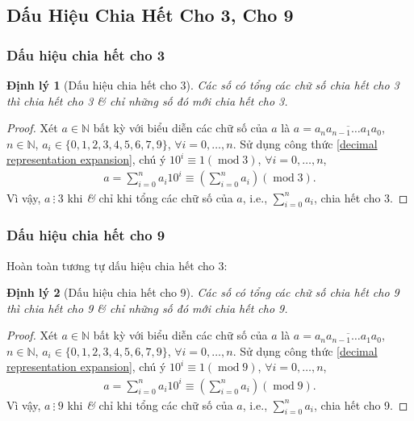 \documentclass{article}
\numberwithin{equation}{section}
\newtheorem{dinhly}{Định lý}[section]
\begin{document}

\subsection{Dấu Hiệu Chia Hết Cho 3, Cho 9}

\subsubsection{Dấu hiệu chia hết cho 3}

\begin{dinhly}[Dấu hiệu chia hết cho 3]
	Các số có tổng các chữ số chia hết cho 3 thì chia hết cho 3 \textit{\&} chỉ những số đó mới chia hết cho 3.
\end{dinhly}

\begin{proof}[Proof]
	Xét $a\in\mathbb{N}$ bất kỳ với biểu diễn các chữ số của $a$ là $a = \overline{a_na_{n-1}\ldots a_1a_0}$, $n\in\mathbb{N}$, $a_i\in\{0,1,2,3,4,5,6,7,9\}$, $\forall i = 0,\ldots,n$. Sử dụng công thức \eqref{decimal representation expansion}, chú ý $10^i\equiv 1(\operatorname{mod} 3)$, $\forall i = 0,\ldots,n$,
	\begin{align*}
		a = \sum_{i=0}^n a_i10^i\equiv\left(\sum_{i=0}^n a_i\right)(\operatorname{mod} 3).
	\end{align*}
	Vì vậy, $a\ \vdots\ 3$ khi \textit{\&} chỉ khi tổng các chữ số của $a$, i.e., $\sum_{i=0}^n a_i$, chia hết cho 3.
\end{proof}

\subsubsection{Dấu hiệu chia hết cho 9}
Hoàn toàn tương tự dấu hiệu chia hết cho 3:

\begin{dinhly}[Dấu hiệu chia hết cho 9]
	Các số có tổng các chữ số chia hết cho 9 thì chia hết cho 9 \textit{\&} chỉ những số đó mới chia hết cho 9.
\end{dinhly}

\begin{proof}[Proof]
	Xét $a\in\mathbb{N}$ bất kỳ với biểu diễn các chữ số của $a$ là $a = \overline{a_na_{n-1}\ldots a_1a_0}$, $n\in\mathbb{N}$, $a_i\in\{0,1,2,3,4,5,6,7,9\}$, $\forall i = 0,\ldots,n$. Sử dụng công thức \eqref{decimal representation expansion}, chú ý $10^i\equiv 1(\operatorname{mod} 9)$, $\forall i = 0,\ldots,n$,
	\begin{align*}
		a = \sum_{i=0}^n a_i10^i\equiv\left(\sum_{i=0}^n a_i\right)(\operatorname{mod} 9).
	\end{align*}
	Vì vậy, $a\ \vdots\ 9$ khi \textit{\&} chỉ khi tổng các chữ số của $a$, i.e., $\sum_{i=0}^n a_i$, chia hết cho 9.
\end{proof}
\end{document}
